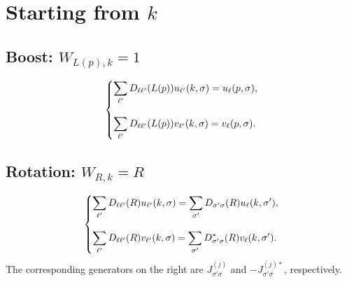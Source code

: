 \section{\texorpdfstring{Starting from $k$}{Starting from k}}
\subsection{\texorpdfstring{Boost: $W_{L(p), k} = 1$}{Boost: W(L(p),k) = 1}}
\begin{equation}
    \begin{dcases}
        \displaystyle \sum_{\ell'} D_{\ell \ell'} (L(p)) u_{\ell'} (k, \sigma) = u_\ell(p, \sigma), \\[3mm]
        \displaystyle \sum_{\ell'} D_{\ell \ell'} (L(p)) v_{\ell'} (k, \sigma) = v_\ell(p, \sigma).
    \end{dcases}
\end{equation}
\subsection{\texorpdfstring{Rotation: $W_{R, k} = R$}{Rotation: W(R,k) = R}}
\begin{equation}
    \begin{dcases}
        \displaystyle \sum_{\ell'} D_{\ell \ell'} (R) u_{\ell'} (k, \sigma) = \sum_{\sigma'} D_{\sigma' \sigma} (R) u_\ell(k, \sigma'), \\[3mm]
        \displaystyle \sum_{\ell'} D_{\ell \ell'} (R) v_{\ell'} (k, \sigma) = \sum_{\sigma'} D^*_{\sigma' \sigma} (R) v_\ell(k, \sigma').
    \end{dcases}
\end{equation}
The corresponding generators on the right are $J^{(j)}_{\sigma' \sigma}$ and $- J^{(j)*}_{\sigma' \sigma}$, respectively.
